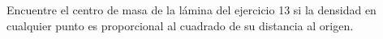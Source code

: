 \item Encuentre el centro de masa de la lámina del ejercicio 13 si la densidad en cualquier punto es proporcional al cuadrado de su distancia al origen.
